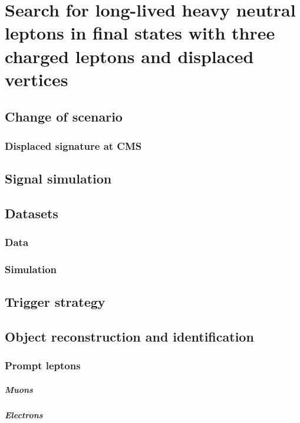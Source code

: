 
\chapter{Search for long-lived heavy neutral leptons in final states
with three charged leptons and displaced vertices} %

\label{Chapter5} %

\section{Change of scenario}
\subsection{Displaced signature at CMS}

\section{Signal simulation}
\section{Datasets}
\subsection{Data}
\subsection{Simulation}

\section{Trigger strategy}
\section{Object reconstruction and identification}
\subsection{Prompt leptons}
\paragraph {Muons}
\paragraph {Electrons}
